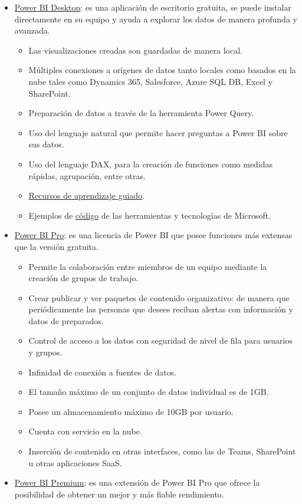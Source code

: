 \documentclass[
]{book}
\providecommand{\tightlist}{%
  \setlength{\itemsep}{0pt}\setlength{\parskip}{0pt}}
\begin{document}
\begin{itemize}
\tightlist
\item
  \href{https://powerbi.microsoft.com/es-es/desktop/}{Power BI Desktop}: es una aplicación de escritorio gratuita, se puede instalar directamente en su equipo y ayuda a explorar los datos de manera profunda y avanzada.

  \begin{itemize}
  \tightlist
  \item
    Las visualizaciones creadas son guardadas de manera local.
  \item
    Múltiples conexiones a orígenes de datos tanto locales como basados en la nube tales como Dynamics 365, Salesforce, Azure SQL DB, Excel y SharePoint.
  \item
    Preparación de datos a través de la herramienta Power Query.
  \item
    Uso del lenguaje natural que permite hacer preguntas a Power BI sobre sus datos.
  \item
    Uso del lenguaje DAX, para la creación de funciones como medidas rápidas, agrupación, entre otras.
  \item
    \href{https://docs.microsoft.com/en-us/learn/}{Recursos de aprendizaje guiado}.
  \item
    Ejemplos de \href{https://docs.microsoft.com/en-us/samples/browse/}{código} de las herramientas y tecnologías de Microsoft.
  \end{itemize}
\item
  \href{https://powerbi.microsoft.com/es-es/power-bi-pro/}{Power BI Pro}: es una licencia de Power BI que posee funciones más extensas que la versión gratuita.

  \begin{itemize}
  \tightlist
  \item
    Permite la colaboración entre miembros de un equipo mediante la creación de grupos de trabajo.
  \item
    Crear publicar y ver paquetes de contenido organizativo: de manera que periódicamente las personas que desees reciban alertas con información y datos de preparados.
  \item
    Control de acceso a los datos con seguridad de nivel de fila para usuarios y grupos.
  \item
    Infinidad de conexión a fuentes de datos.
  \item
    El tamaño máximo de un conjunto de datos individual es de 1GB.
  \item
    Posee un almacenamiento máximo de 10GB por usuario.
  \item
    Cuenta con servicio en la nube.
  \item
    Inserción de contenido en otras interfaces, como las de Teams, SharePoint u otras aplicaciones SaaS.
  \end{itemize}
\item
  \href{https://powerbi.microsoft.com/es-es/power-bi-premium/}{Power BI Premium}: es una extensión de Power BI Pro que ofrece la posibilidad de obtener un mejor y más fiable rendimiento.


\end{itemize}
\end{document}
